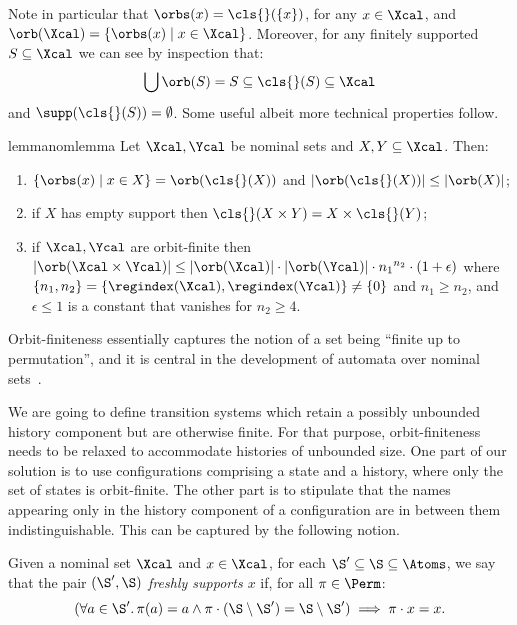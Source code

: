 Note in particular that
$\orbs(x)=\cls{}(\{x\})$, for any $x\in\Xcal$, and
$\orb(\Xcal) = \{ \orbs(x) \mid x \in \Xcal\}$.
Moreover, for any finitely supported $S\subseteq\Xcal$ we can see by inspection that:
\[\bigcup\orb(S)=S\subseteq\cls{}(S)\subseteq\Xcal
  \]
and $\supp(\cls{}(S))=\emptyset$. Some useful albeit more technical properties follow.

\begin{restatable}{lemma}{nomlemma}\label{lem:nomlemma}
	Let $\Xcal,\Ycal$ be nominal sets and $X,Y \subseteq \Xcal$. 
	Then:
	\begin{enumerate}
		\item\label{nomlemma:orbs} $\{\orbs(x) \mid x \in X\} = \orb(\cls{}(X))$ and $|\orb(\cls{}(X))| \le |\orb(X)|$;
		\item\label{nomlemma:cls} if $X$ has empty support then $\cls{}(X \times Y) = X \times \cls{}(Y)$;
		\item\label{nomlemma:prod} if $\Xcal,\Ycal$ are orbit-finite then
		$|\orb(\Xcal \times \Ycal)| \le |\orb(\Xcal)|\cdot|\orb(\Ycal)|\cdot {n_1}^{n_2}\cdot(1 + \epsilon)$ where $\{n_1,n_2\}=\{\regindex(\Xcal), \regindex(\Ycal)\}\neq\{0\}$ and $n_1\geq n_2$,
		and $\epsilon\leq 1$ is a constant that vanishes for $n_2\geq 4$. 
	\end{enumerate}
\end{restatable}
\vspace{1em}


Orbit-finiteness essentially captures the notion of a set being ``finite up to permutation'', and it is central in the development of automata over nominal sets~\cite{automatanominalsets}.

We are going to define transition systems which retain a possibly unbounded history component but are otherwise finite. For that purpose, orbit-finiteness needs to be relaxed to accommodate histories of unbounded size. One part of our solution is to use configurations comprising a state and a history, where only the set of states is orbit-finite. The other part is to stipulate that the names appearing only in the history component of a configuration are in between them indistinguishable. This can be captured by the following notion.

\begin{definition}
  Given a nominal set $\Xcal$ and $x\in\Xcal$, for each $\S'\subseteq\S\subseteq\Atoms$, we say that the pair \emph{$(\S',\S)$ freshly supports $x$} if, for all $\pi\in\Perm$:
  \[ (\forall a\in\S'.\,\pi(a)=a\land\pi\cdot (\S\setminus\S')=\S\setminus\S')
    \implies \pi\cdot x=x.
  \]
\end{definition}

